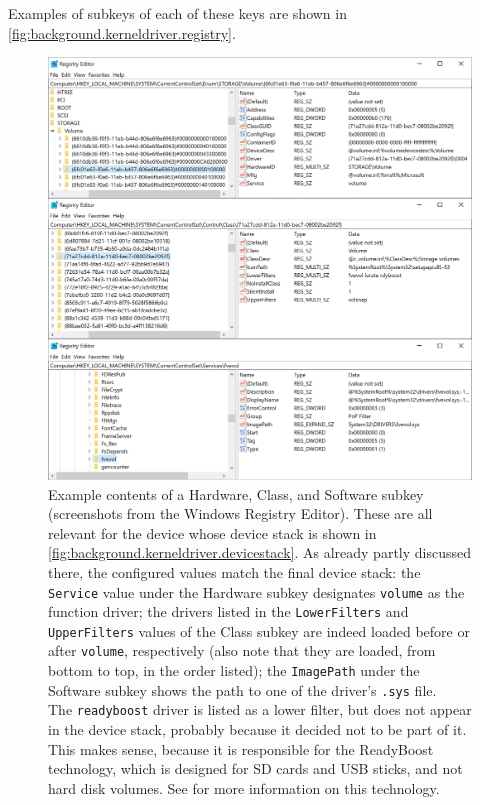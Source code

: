 Examples of subkeys of each of these keys are shown in \autoref{fig:background.kerneldriver.registry}.

\begin{figure}[htb!]
	\center
	
	\includegraphics[scale=0.65]{../img/background.kerneldriver.registry.png}
	\caption[
		Example contents of a Hardware, Class, and Software subkey
	]{
		Example contents of a Hardware, Class, and Software subkey (screenshots from the Windows Registry Editor). These are all relevant for the device whose device stack is shown in \autoref{fig:background.kerneldriver.devicestack}. As already partly discussed there, the configured values match the final device stack: the \texttt{Service} value under the Hardware subkey designates \texttt{volume} as the function driver; the drivers listed in the \texttt{LowerFilters} and \texttt{UpperFilters} values of the Class subkey are indeed loaded before or after \texttt{volume}, respectively (also note that they are loaded, from bottom to top, in the order listed); the \texttt{ImagePath} under the Software subkey shows the path to one of the driver's \texttt{.sys} file.\\
		The \texttt{readyboost} driver is listed as a lower filter, but does not appear in the device stack, probably because it decided not to be part of it. This makes sense, because it is responsible for the ReadyBoost technology, which is designed for SD cards and USB sticks, and not hard disk volumes. See \cite{Yosifovich2017} for more information on this technology.
	}
	\label{fig:background.kerneldriver.registry}
\end{figure}

